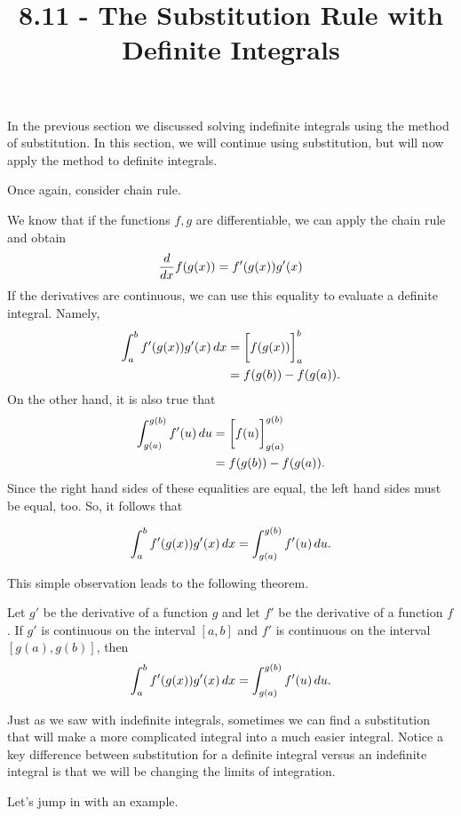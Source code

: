 \documentclass{ximera}
\title{8.11 - The Substitution Rule with Definite Integrals}
\begin{document}
\maketitle


In the previous section we discussed solving indefinite integrals using the method of substitution. In this section, we will continue using substitution, but will now apply the method to definite integrals. 

Once again, consider chain rule. 

We know that if the functions $f,g$ are differentiable, we can apply the chain rule and obtain
\[
\frac{d}{\mathop{}\!d x} f(g(x)) = f'(g(x))g'(x)
\]
If the derivatives are continuous, we can use this equality to evaluate a definite integral. Namely,
\begin{align*}
  \int_a^b f'(g(x))g'(x) \mathop{}\!d x &= \bigg[ f(g(x)) \bigg]_a^b \\
  &= f(g(b)) - f(g(a)). \\
 \end{align*}
On the other hand, it is also true that
\begin{align*}
  \int_{g(a)}^{g(b)} f'(u)\mathop{}\!d u &= \bigg[ f(u) \bigg]_{g(a)}^{g(b)}\\
  &= f(g(b)) - f(g(a)). \\
 \end{align*}
 Since the right hand sides of these equalities are equal,  the left hand sides must be equal, too. So, it follows that
 
\[
  \int_a^b f'(g(x))g'(x) \mathop{}\!d x =  \int_{g(a)}^{g(b)} f'(u)\mathop{}\!d u .
\]

 
This simple observation  leads to the following theorem. 


\begin{theorem} 
Let $g'$ be the derivative of a  function $g$ and let $f'$ be the derivative of a function $f$. If $g'$ is continuous on the interval $[a,b]$ and  $f'$ is
continuous on the interval $[g(a),g(b)]$, then
\[
\int_a^b f'(g(x)) g'(x) \mathop{}\!d x =\int_{g(a)}^{g(b)} f'(u) \mathop{}\!d u.
\]
\end{theorem}
Just as we saw with indefinite integrals, sometimes we can find a substitution that will make a more complicated integral into a much easier integral. Notice a key difference between substitution for a definite integral versus an indefinite integral is that we will be changing the limits of integration. 

Let's jump in with an example.
\end{document}
